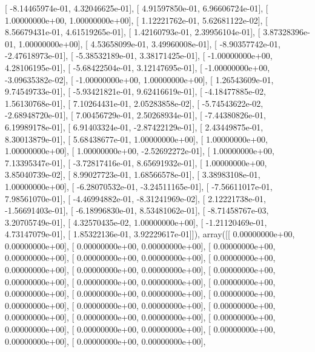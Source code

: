 \documentclass{article}
\begin{document}
       [ -8.14465974e-01,   4.32046625e-01],
       [  4.91597850e-01,   6.96606724e-01],
       [  1.00000000e+00,   1.00000000e+00],
       [  1.12221762e-01,   5.62681122e-02],
       [  8.56679431e-01,   4.61519265e-01],
       [  1.42160793e-01,   2.39956104e-01],
       [  3.87328396e-01,   1.00000000e+00],
       [  4.53658099e-01,   3.49960008e-01],
       [ -8.90357742e-01,  -2.47618973e-01],
       [ -5.38532189e-01,   3.38171425e-01],
       [ -1.00000000e+00,   4.28106195e-01],
       [ -5.68422504e-01,   3.12147695e-01],
       [ -1.00000000e+00,  -3.09635382e-02],
       [ -1.00000000e+00,   1.00000000e+00],
       [  1.26543609e-01,   9.74549733e-01],
       [ -5.93421821e-01,   9.62416619e-01],
       [ -4.18477885e-02,   1.56130768e-01],
       [  7.10264431e-01,   2.05283858e-02],
       [ -5.74543622e-02,  -2.68948720e-01],
       [  7.00456729e-01,   2.50268934e-01],
       [ -7.44380826e-01,   6.19989178e-01],
       [  6.91403324e-01,  -2.87422129e-01],
       [  2.43449875e-01,   8.30013879e-01],
       [  5.68438677e-01,   1.00000000e+00],
       [  1.00000000e+00,   1.00000000e+00],
       [  1.00000000e+00,  -2.52692272e-01],
       [  1.00000000e+00,   7.13395347e-01],
       [ -3.72817416e-01,   8.65691932e-01],
       [  1.00000000e+00,   3.85040739e-02],
       [  8.99027723e-01,   1.68566578e-01],
       [  3.38983108e-01,   1.00000000e+00],
       [ -6.28070532e-01,  -3.24511165e-01],
       [ -7.56611017e-01,   7.98561070e-01],
       [ -4.46994882e-01,  -8.31241969e-02],
       [  2.12221738e-01,  -1.56691403e-01],
       [ -6.18996830e-01,   8.53481062e-01],
       [ -8.71458767e-03,   3.20705749e-01],
       [  4.32570435e-02,   1.00000000e+00],
       [ -1.21120469e-01,   4.73147079e-01],
       [  1.85322136e-01,   3.92229617e-01]]), array([[  0.00000000e+00,   0.00000000e+00],
       [  0.00000000e+00,   0.00000000e+00],
       [  0.00000000e+00,   0.00000000e+00],
       [  0.00000000e+00,   0.00000000e+00],
       [  0.00000000e+00,   0.00000000e+00],
       [  0.00000000e+00,   0.00000000e+00],
       [  0.00000000e+00,   0.00000000e+00],
       [  0.00000000e+00,   0.00000000e+00],
       [  0.00000000e+00,   0.00000000e+00],
       [  0.00000000e+00,   0.00000000e+00],
       [  0.00000000e+00,   0.00000000e+00],
       [  0.00000000e+00,   0.00000000e+00],
       [  0.00000000e+00,   0.00000000e+00],
       [  0.00000000e+00,   0.00000000e+00],
       [  0.00000000e+00,   0.00000000e+00],
       [  0.00000000e+00,   0.00000000e+00],
       [  0.00000000e+00,   0.00000000e+00],
       [  0.00000000e+00,   0.00000000e+00],
\end{document}
